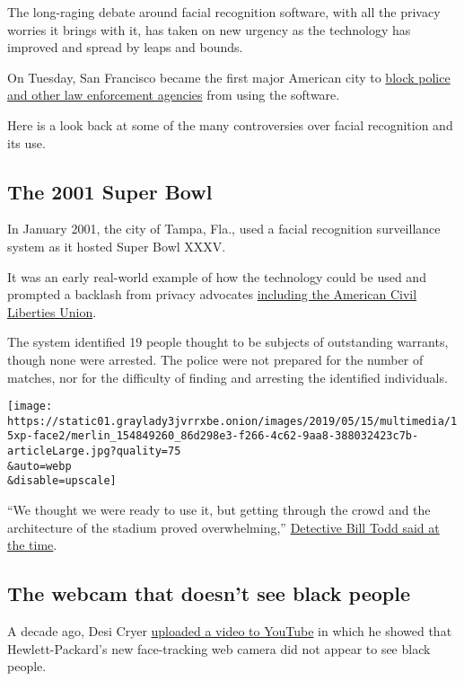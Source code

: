 The long-raging debate around facial recognition software, with all the
privacy worries it brings with it, has taken on new urgency as the
technology has improved and spread by leaps and bounds.

On Tuesday, San Francisco became the first major American city to
\href{https://www.nytimes3xbfgragh.onion/2019/05/14/us/facial-recognition-ban-san-francisco.html}{block
police and other law enforcement agencies} from using the software.

Here is a look back at some of the many controversies over facial
recognition and its use.

\hypertarget{the-2001-super-bowl}{%
\subsection{The 2001 Super Bowl}\label{the-2001-super-bowl}}

In January 2001, the city of Tampa, Fla., used a facial recognition
surveillance system as it hosted Super Bowl XXXV.

It was an early real-world example of how the technology could be used
and prompted a backlash from privacy advocates
\href{https://www.aclu.org/other/use-facial-recognition-super-bowl-and-tampa}{including
the American Civil Liberties Union}.

The system identified 19 people thought to be subjects of outstanding
warrants, though none were arrested. The police were not prepared for
the number of matches, nor for the difficulty of finding and arresting
the identified individuals.

\texttt{[image: https://static01.graylady3jvrrxbe.onion/images/2019/05/15/multimedia/15xp-face2/merlin\_154849260\_86d298e3-f266-4c62-9aa8-388032423c7b-articleLarge.jpg?quality=75\\\&auto=webp\\\&disable=upscale]}

``We thought we were ready to use it, but getting through the crowd and
the architecture of the stadium proved overwhelming,''
\href{https://www.nytimes3xbfgragh.onion/2001/07/04/us/tampa-scans-the-faces-in-its-crowds-for-criminals.html}{Detective
Bill Todd said at the time}.

\hypertarget{the-webcam-that-doesnt-see-black-people}{%
\subsection{The webcam that doesn't see black
people}\label{the-webcam-that-doesnt-see-black-people}}

A decade ago, Desi Cryer
\href{https://www.youtube.com/watch?v=t4DT3tQqgRM}{uploaded a video to
YouTube} in which he showed that Hewlett-Packard's new face-tracking web
camera did not appear to see black people.

